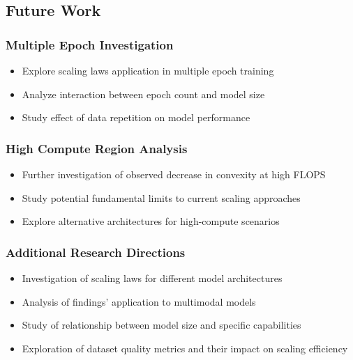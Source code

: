 \documentclass{article}
\begin{document}
\subsection{Future Work}
\subsubsection{Multiple Epoch Investigation}
\begin{itemize}
    \item Explore scaling laws application in multiple epoch training
    \item Analyze interaction between epoch count and model size
    \item Study effect of data repetition on model performance
\end{itemize}

\subsubsection{High Compute Region Analysis}
\begin{itemize}
    \item Further investigation of observed decrease in convexity at high FLOPS
    \item Study potential fundamental limits to current scaling approaches
    \item Explore alternative architectures for high-compute scenarios
\end{itemize}

\subsubsection{Additional Research Directions}
\begin{itemize}
    \item Investigation of scaling laws for different model architectures
    \item Analysis of findings' application to multimodal models
    \item Study of relationship between model size and specific capabilities
    \item Exploration of dataset quality metrics and their impact on scaling efficiency
\end{itemize}
\end{document}
